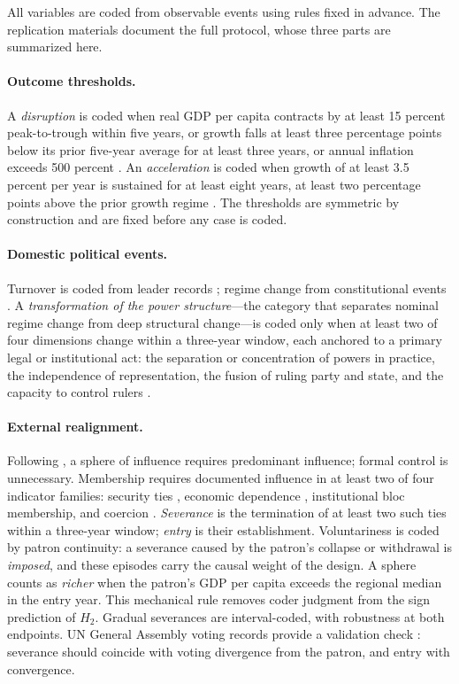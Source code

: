 \documentclass[11pt]{article}
\begin{document}
All variables are coded from observable events using rules fixed in advance. The replication materials document the full protocol, whose three parts are summarized here.

\paragraph{Outcome thresholds.} A \emph{disruption} is coded when real GDP per capita contracts by at least 15 percent peak-to-trough within five years, or growth falls at least three percentage points below its prior five-year average for at least three years, or annual inflation exceeds 500 percent \parencite{rodrik_1999}. An \emph{acceleration} is coded when growth of at least 3.5 percent per year is sustained for at least eight years, at least two percentage points above the prior growth regime \parencite{hausmann_pritchett_rodrik_2005}. The thresholds are symmetric by construction and are fixed before any case is coded.

\paragraph{Domestic political events.} Turnover is coded from leader records \parencite{goemans_gleditsch_chiozza_2009}; regime change from constitutional events \parencite{elkins_ginsburg_melton_2009}. A \emph{transformation of the power structure}---the category that separates nominal regime change from deep structural change---is coded only when at least two of four dimensions change within a three-year window, each anchored to a primary legal or institutional act: the separation or concentration of powers in practice, the independence of representation, the fusion of ruling party and state, and the capacity to control rulers \parencite{garciatrevijano2010}.

\paragraph{External realignment.} Following \textcite{keal_1983}, a sphere of influence requires predominant influence; formal control is unnecessary. Membership requires documented influence in at least two of four indicator families: security ties \parencite{leeds_etal_2002,gibler_sarkees_2004}, economic dependence \parencite{imf_dots}, institutional bloc membership, and coercion \parencite{felbermayr_etal_2020}. \emph{Severance} is the termination of at least two such ties within a three-year window; \emph{entry} is their establishment. Voluntariness is coded by patron continuity: a severance caused by the patron's collapse or withdrawal is \emph{imposed}, and these episodes carry the causal weight of the design. A sphere counts as \emph{richer} when the patron's GDP per capita exceeds the regional median in the entry year. This mechanical rule removes coder judgment from the sign prediction of $H_2$. Gradual severances are interval-coded, with robustness at both endpoints. UN General Assembly voting records provide a validation check \parencite{bailey_strezhnev_voeten_2017}: severance should coincide with voting divergence from the patron, and entry with convergence.
\end{document}
